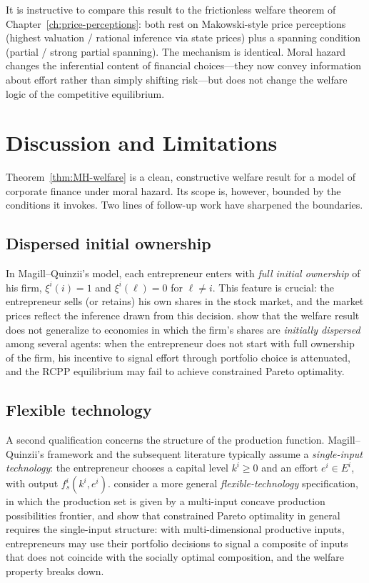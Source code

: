 \documentclass[11pt,a4paper,oneside]{book}
\def\geq{\geqslant}
\theoremstyle{plain}
\theoremstyle{definition}
\theoremstyle{remark}
\numberwithin{equation}{chapter}
\begin{document}
It is instructive to compare this result to the frictionless welfare theorem of Chapter~\ref{ch:price-perceptions}: both rest on Makowski-style price perceptions (highest valuation / rational inference via state prices) plus a spanning condition (partial / strong partial spanning).
The mechanism is identical.
Moral hazard changes the inferential content of financial choices---they now convey information about effort rather than simply shifting risk---but does not change the welfare logic of the competitive equilibrium.

\section{Discussion and Limitations}
\label{sec:MH-limitations}

Theorem~\ref{thm:MH-welfare} is a clean, constructive welfare result for a model of corporate finance under moral hazard.
Its scope is, however, bounded by the conditions it invokes.
Two lines of follow-up work have sharpened the boundaries.

\subsection{Dispersed initial ownership}

In Magill--Quinzii's model, each entrepreneur enters with \emph{full initial ownership} of his firm, $\xi^i(i) = 1$ and $\xi^i(\ell) = 0$ for $\ell \neq i$.
This feature is crucial: the entrepreneur sells (or retains) his own shares in the stock market, and the market prices reflect the inference drawn from this decision.
\citet{CalcagnoWagner2006} show that the welfare result does not generalize to economies in which the firm's shares are \emph{initially dispersed} among several agents: when the entrepreneur does not start with full ownership of the firm, his incentive to signal effort through portfolio choice is attenuated, and the RCPP equilibrium may fail to achieve constrained Pareto optimality.

\subsection{Flexible technology}

A second qualification concerns the structure of the production function.
Magill--Quinzii's framework and the subsequent literature typically assume a \emph{single-input technology}: the entrepreneur chooses a capital level $k^i \geq 0$ and an effort $e^i \in E^i$, with output $f^i_s(k^i, e^i)$.
\citet{QuigginChambers2006} consider a more general \emph{flexible-technology} specification, in which the production set is given by a multi-input concave production possibilities frontier, and show that constrained Pareto optimality in general requires the single-input structure: with multi-dimensional productive inputs, entrepreneurs may use their portfolio decisions to signal a composite of inputs that does not coincide with the socially optimal composition, and the welfare property breaks down.
\end{document}
